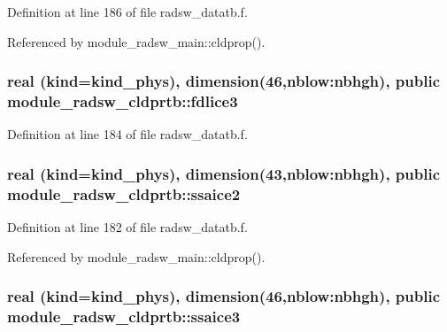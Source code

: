Definition at line 186 of file radsw\+\_\+datatb.\+f.



Referenced by module\+\_\+radsw\+\_\+main\+::cldprop().

\subsubsection[{\texorpdfstring{fdlice3}{fdlice3}}]{\setlength{\rightskip}{0pt plus 5cm}real (kind=kind\+\_\+phys), dimension(46,nblow\+:nbhgh), public module\+\_\+radsw\+\_\+cldprtb\+::fdlice3}\hypertarget{namespacemodule__radsw__cldprtb_aa42cf6596d2dcd887864b1de40da3293}{}\label{namespacemodule__radsw__cldprtb_aa42cf6596d2dcd887864b1de40da3293}


Definition at line 184 of file radsw\+\_\+datatb.\+f.

\subsubsection[{\texorpdfstring{ssaice2}{ssaice2}}]{\setlength{\rightskip}{0pt plus 5cm}real (kind=kind\+\_\+phys), dimension(43,nblow\+:nbhgh), public module\+\_\+radsw\+\_\+cldprtb\+::ssaice2}\hypertarget{namespacemodule__radsw__cldprtb_a48555ff54d3a46f8c49733ff82e94d70}{}\label{namespacemodule__radsw__cldprtb_a48555ff54d3a46f8c49733ff82e94d70}


Definition at line 182 of file radsw\+\_\+datatb.\+f.



Referenced by module\+\_\+radsw\+\_\+main\+::cldprop().

\subsubsection[{\texorpdfstring{ssaice3}{ssaice3}}]{\setlength{\rightskip}{0pt plus 5cm}real (kind=kind\+\_\+phys), dimension(46,nblow\+:nbhgh), public module\+\_\+radsw\+\_\+cldprtb\+::ssaice3}\hypertarget{namespacemodule__radsw__cldprtb_a39b045b05e6bc9c04603277654ff8fc6}{}\label{namespacemodule__radsw__cldprtb_a39b045b05e6bc9c04603277654ff8fc6}


